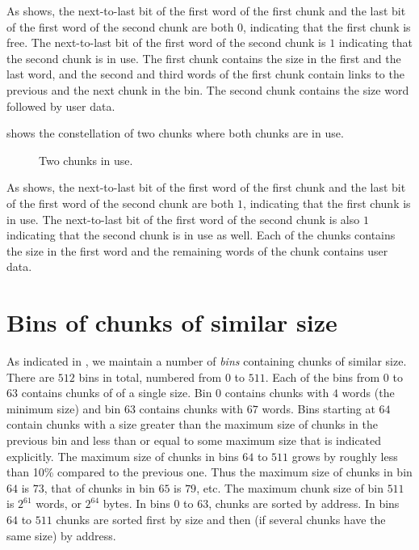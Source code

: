 As  shows, the next-to-last bit of the first word
of the first chunk and the last bit of the first word of the second
chunk are both $0$, indicating that the first chunk is free.  The
next-to-last bit of the first word of the second chunk is $1$
indicating that the second chunk is in use.  The first chunk contains
the size in the first and the last word, and the second and third
words of the first chunk contain links to the previous and the next
chunk in the bin.  The second chunk contains the size word followed by
user data.

 shows the constellation of two chunks where both
chunks are in use.

\begin{figure}
\begin{center}
\end{center}
\caption{\label{fig-chunks4}
Two chunks in use.}
\end{figure}

As  shows, the next-to-last bit of the first word
of the first chunk and the last bit of the first word of the second
chunk are both $1$, indicating that the first chunk is in use.  The
next-to-last bit of the first word of the second chunk is also $1$
indicating that the second chunk is in use as well.  Each of the
chunks contains the size in the first word and the remaining words of
the chunk contains user data.

\section{Bins of chunks of similar size}
\label{sec-memory-allocator-bins-of-chunks}

As indicated in
, we maintain
a number of \emph{bins} containing chunks of similar size.  There are
$512$ bins in total, numbered from $0$ to $511$.  Each of the bins
from $0$ to $63$ contains chunks of of a single size.  Bin $0$
contains chunks with $4$ words (the minimum size) and bin $63$
contains chunks with $67$ words.  Bins starting at $64$ contain chunks
with a size greater than the maximum size of chunks in the previous
bin and less than or equal to some maximum size that is indicated
explicitly.  The maximum size of chunks in bins $64$ to $511$ grows by
roughly less than 10\% compared to the previous one.  Thus the maximum
size of chunks in bin $64$ is $73$, that of chunks in bin $65$ is
$79$, etc.  The maximum chunk size of bin $511$ is $2^{61}$ words, or
$2^{64}$ bytes.  In bins $0$ to $63$, chunks are sorted by address.
In bins $64$ to $511$ chunks are sorted first by size and then (if
several chunks have the same size) by address.

